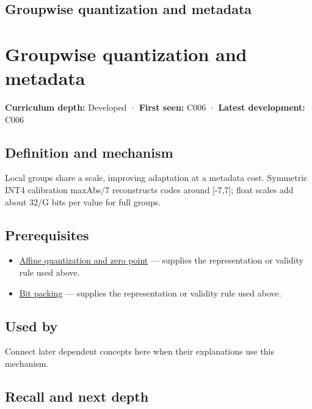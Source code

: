 \hypertarget{appendix-638204c40e8b}{}
\section*{Groupwise quantization and metadata}
\chapter{Groupwise quantization and metadata}\label{appendix-638204c40e8b-groupwise-quantization-and-metadata}

\textbf{Curriculum depth:} Developed · \textbf{First seen:} C006 · \textbf{Latest development:} C006

\section{Definition and mechanism}\label{appendix-638204c40e8b-definition-and-mechanism}

Local groups share a scale, improving adaptation at a metadata cost. Symmetric INT4 calibration maxAbs/7 reconstructs codes around {[}-7,7{]}; float scales add about 32/G bits per value for full groups.

\section{Prerequisites}\label{appendix-638204c40e8b-prerequisites}

\begin{itemize}
\tightlist
\item
  \hyperref[appendix-d5da3eaabaef]{Affine quantization and zero point} --- supplies the representation or validity rule used above.
\item
  \hyperref[appendix-1f9963e1a5d1]{Bit packing} --- supplies the representation or validity rule used above.
\end{itemize}

\section{Used by}\label{appendix-638204c40e8b-used-by}

Connect later dependent concepts here when their explanations use this mechanism.

\section{Recall and next depth}\label{appendix-638204c40e8b-recall-and-next-depth}

